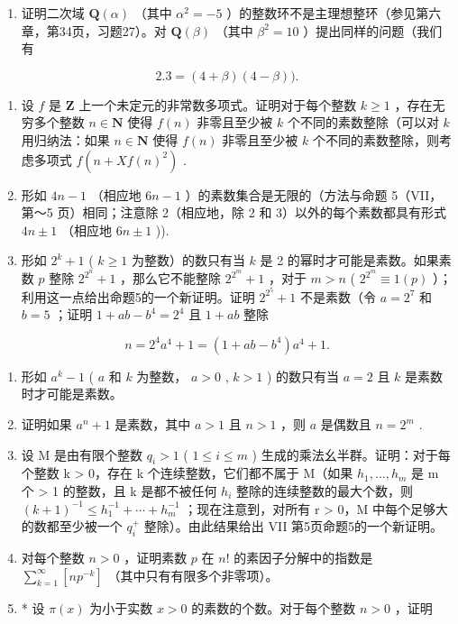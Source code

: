 \begin{enumerate}
\def\labelenumi{\arabic{enumi})}
\setcounter{enumi}{11}
\tightlist
\item
  证明二次域 \(\mathbf{Q}(\alpha)\) （其中 \(\alpha^2 = -5\) ）的整数环不是主理想整环（参见第六章，第34页，习题27）。对 \(\mathbf{Q}(\beta)\) （其中 \(\beta^2 = 10\) ）提出同样的问题（我们有
\end{enumerate}

\[
2. 3 = (4 + \beta) (4 - \beta)).
\]

\begin{enumerate}
\def\labelenumi{\arabic{enumi})}
\setcounter{enumi}{12}
\item
  设 \(f\) 是 \(\mathbf{Z}\) 上一个未定元的非常数多项式。证明对于每个整数 \(k \geqslant 1\) ，存在无穷多个整数 \(n \in \mathbf{N}\) 使得 \(f(n)\) 非零且至少被 \(k\) 个不同的素数整除（可以对 \(k\) 用归纳法：如果 \(n \in \mathbf{N}\) 使得 \(f(n)\) 非零且至少被 \(k\) 个不同的素数整除，则考虑多项式 \(f(n + Xf(n)^2)\) .
\item
  形如 \(4n - 1\) （相应地 \(6n - 1\) ）的素数集合是无限的（方法与命题 5（VII，第～5 页）相同；注意除 2（相应地，除 2 和 3）以外的每个素数都具有形式 \(4n \pm 1\) （相应地 \(6n \pm 1\) )).
\item
  形如 \(2^k + 1\) ( \(k \geqslant 1\) 为整数）的数只有当 \(k\) 是 2 的幂时才可能是素数。如果素数 \(p\) 整除 \(2^{2^n} + 1\) ，那么它不能整除 \(2^{2^m} + 1\) ，对于 \(m > n\) ( \(2^{2^m} \equiv 1(p)\) ）；利用这一点给出命题5的一个新证明。证明 \(2^{2^5} + 1\) 不是素数（令 \(a = 2^7\) 和 \(b = 5\) ；证明 \(1 + ab - b^4 = 2^4\) 且 \(1 + ab\) 整除
\end{enumerate}

\[
n = 2 ^ {4} a ^ {4} + 1 = (1 + a b - b ^ {4}) a ^ {4} + 1.
\]

\begin{enumerate}
\def\labelenumi{\arabic{enumi})}
\setcounter{enumi}{15}
\item
  形如 \(a^k - 1\) ( \(a\) 和 \(k\) 为整数， \(a > 0\) , \(k > 1\) ) 的数只有当 \(a = 2\) 且 \(k\) 是素数时才可能是素数。
\item
  证明如果 \(a^n + 1\) 是素数，其中 \(a > 1\) 且 \(n > 1\) ，则 \(a\) 是偶数且 \(n = 2^m\) .
\item
  设 M 是由有限个整数 \(q_{i} > 1\) ( \(1 \leqslant i \leqslant m\) ) 生成的乘法幺半群。证明：对于每个整数 k \textgreater{} 0，存在 k 个连续整数，它们都不属于 M（如果 \(h_{1}, \ldots, h_{m}\) 是 m 个 \textgreater{} 1 的整数，且 k 是都不被任何 \(h_{i}\) 整除的连续整数的最大个数，则 \((k + 1)^{-1} \leqslant h_{1}^{-1} + \cdots + h_{m}^{-1}\) ；现在注意到，对所有 r \textgreater{} 0，M 中每个足够大的数都至少被一个 \(q_{i}^{+}\) 整除）。由此结果给出 VII 第5页命题5的一个新证明。
\item
  对每个整数 \(n > 0\) ，证明素数 \(p\) 在 \(n!\) 的素因子分解中的指数是 \(\sum_{k=1}^{\infty} [np^{-k}]\) （其中只有有限多个非零项）。
\item
  * 设 \(\pi(x)\) 为小于实数 \(x > 0\) 的素数的个数。对于每个整数 \(n > 0\) ，证明
\end{enumerate}

